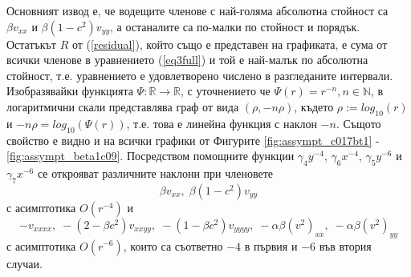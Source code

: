 \documentclass{article}
\newcommand{\rf}[1]{(\ref{#1})}
\newcommand{\RR}{\mathbb{R}}
\theoremstyle{remark}
\begin{document}
Основният извод е, че водещите членове с най-голяма абсолютна стойност са $\beta v_{xx}$ и $\beta (1-c^2) v_{yy}$, а останалите са по-малки по стойност и порядък. Остатъкът $R$ от \rf{residual}, който също е представен на графиката, е сума от всички членове в уравнението \rf{eq3full} и той е най-малък по абсолютна стойност, т.е. уравнението е удовлетворено числено в разгледаните интервали. 
Изобразявайки функцията $\Psi : \RR \rightarrow \RR$, с уточнението че $\Psi(r) = r^{-n}, n \in \mathbb{N}$, в логаритмични скали представлява граф от вида $(\rho, -n \rho )$, където $\rho := log_{10}(r)$ и $ -n \rho = log_{10}( \Psi(r) ) $, т.е. това е линейна функция с наклон $-n$. Същото свойство е видно и на всички графики от Фигурите \ref{fig:assympt_c017bt1} - \ref{fig:assympt_beta1c09}. Посредством помощните функции $\gamma_4 y^{-4}$, $\gamma_6 x^{-4}$, $\gamma_5 y^{-6}$ и $\gamma_7 x^{-6}$ се открояват различните наклони при членовете 
$$
\beta v_{xx}, \; \beta (1-c^2) v_{yy}
$$ 
с асимптотика $O(r^{-4})$ и 
$$
- v_{xxxx}, \;  - (2-\beta c^2)v_{xxyy},  \;  - (1-\beta c^2)v_{yyyy}, \;  - \alpha \beta (v^2)_{xx}, \; - \alpha \beta (v^2)_{yy}
$$
с асимптотика $O(r^{-6})$, които са съответно $-4$ в първия и $-6$ във втория случаи.
\end{document}
